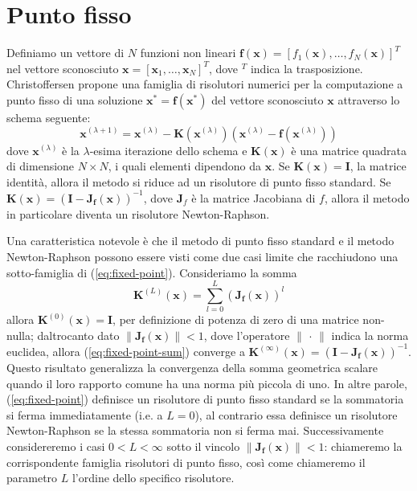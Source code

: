 \chapter{Punto fisso}
	Definiamo un vettore di $N$ funzioni non lineari $\mathbf{f(x)} = [f_{1}(\mathbf{x}), \dots , f_{N}(\mathbf{x})]^{T}$ nel vettore sconosciuto $\mathbf{x} = [\mathbf{x}_{1}, \dots , \mathbf{x}_{N}]^{T}$, dove $^T$ indica la trasposizione. Christoffersen propone una famiglia di risolutori numerici per la computazione a punto fisso di una soluzione $\mathbf{x}^{*} = \mathbf{f(x^{*})}$ del vettore sconosciuto $\mathbf{x}$ attraverso lo schema seguente:
	\begin{equation}
		\label{eq:fixed-point}
		\mathbf{x}^{(\lambda+1)} = \mathbf{x}^{(\lambda)}-\mathbf{K}(\mathbf{x}^{(\lambda)})(\mathbf{x}^{(\lambda)}-\mathbf{f}(\mathbf{x}^{(\lambda)}))
	\end{equation}
	dove $\mathbf{x}^{(\lambda)}$ è la $\lambda$-esima iterazione dello schema e $\mathbf{K(x)}$ è una matrice quadrata di dimensione $N \times N$, i quali elementi dipendono da $\mathbf{x}$. Se $\mathbf{K}(\mathbf{x}) = \mathbf{I}$, la matrice identità, allora il metodo si riduce ad un risolutore di punto fisso standard. Se $\mathbf{K}(\mathbf{x}) = (\mathbf{I}-\mathbf{J_{f}(x)})^{-1}$, dove $\mathbf{J}_{f}$ è la matrice Jacobiana di $f$, allora il metodo in particolare diventa un risolutore Newton-Raphson.
		
	Una caratteristica notevole è che il metodo di punto fisso standard e il metodo Newton-Raphson possono essere visti come due casi limite che racchiudono una sotto-famiglia di (\ref{eq:fixed-point}). Consideriamo la somma
	\begin{equation}
		\label{eq:fixed-point-sum}
		\mathbf{K}^{(L)}(\mathbf{x}) = \sum_{l=0}^{L} \left(\mathbf{J_{f}(x)}\right)^{l}
	\end{equation}
	allora $\mathbf{K}^{(0)}(\mathbf{x}) = \mathbf{I}$, per definizione di potenza di zero di una matrice non-nulla; daltrocanto dato $\lVert\mathbf{J_{f}(x)}\rVert < 1$, dove l'operatore $\lVert\,\cdot\,\rVert$ indica la norma euclidea, allora (\ref{eq:fixed-point-sum}) converge a $\mathbf{K}^{(\infty)}(\mathbf{x}) = (\mathbf{I}-\mathbf{J_{f}(x)})^{-1}$. Questo risultato generalizza la convergenza della somma geometrica scalare quando il loro rapporto comune ha una norma più piccola di uno. In altre parole, (\ref{eq:fixed-point}) definisce un risolutore di punto fisso standard se la sommatoria si ferma immediatamente (i.e. a $L = 0$), al contrario essa definisce un risolutore Newton-Raphson se la stessa sommatoria non si ferma mai. Successivamente considereremo i casi $0 < L < \infty$ sotto il vincolo $\lVert\mathbf{J_{f}(x)}\rVert < 1$: chiameremo la corrispondente famiglia risolutori di punto fisso, così come chiameremo il parametro $L$ l'ordine dello specifico risolutore.